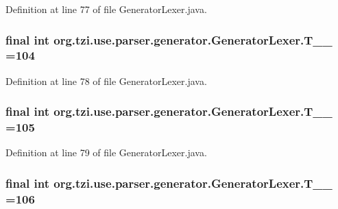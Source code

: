 Definition at line 77 of file Generator\-Lexer.\-java.

\hypertarget{classorg_1_1tzi_1_1use_1_1parser_1_1generator_1_1_generator_lexer_a99730ce46c8cb0e8d7dd813a1038ce99}{
\subsubsection[{T\-\_\-\-\_\-104}]{\setlength{\rightskip}{0pt plus 5cm}final int org.\-tzi.\-use.\-parser.\-generator.\-Generator\-Lexer.\-T\-\_\-\-\_ =104\hspace{0.3cm}{\ttfamily [static]}}}\label{classorg_1_1tzi_1_1use_1_1parser_1_1generator_1_1_generator_lexer_a99730ce46c8cb0e8d7dd813a1038ce99}


Definition at line 78 of file Generator\-Lexer.\-java.

\hypertarget{classorg_1_1tzi_1_1use_1_1parser_1_1generator_1_1_generator_lexer_ae3abd890880efa307e19c1daeb66d988}{
\subsubsection[{T\-\_\-\-\_\-105}]{\setlength{\rightskip}{0pt plus 5cm}final int org.\-tzi.\-use.\-parser.\-generator.\-Generator\-Lexer.\-T\-\_\-\-\_ =105\hspace{0.3cm}{\ttfamily [static]}}}\label{classorg_1_1tzi_1_1use_1_1parser_1_1generator_1_1_generator_lexer_ae3abd890880efa307e19c1daeb66d988}


Definition at line 79 of file Generator\-Lexer.\-java.

\hypertarget{classorg_1_1tzi_1_1use_1_1parser_1_1generator_1_1_generator_lexer_a02bb2904346b83ace64aec9495641d7c}{
\subsubsection[{T\-\_\-\-\_\-106}]{\setlength{\rightskip}{0pt plus 5cm}final int org.\-tzi.\-use.\-parser.\-generator.\-Generator\-Lexer.\-T\-\_\-\-\_ =106\hspace{0.3cm}{\ttfamily [static]}}}\label{classorg_1_1tzi_1_1use_1_1parser_1_1generator_1_1_generator_lexer_a02bb2904346b83ace64aec9495641d7c}



